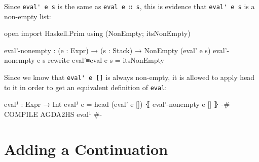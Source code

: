 \documentclass{article}
\begin{document}
\noindent
Since \verb!eval' e s! is the same as \verb!eval e ∷ s!, this is evidence that \verb!eval' e s! is a non-empty list:

\begin{code}
  open import Haskell.Prim using (NonEmpty; itsNonEmpty)

  eval'-nonempty : (e : Expr) → (s : Stack) → NonEmpty (eval' e s)
  eval'-nonempty e s rewrite eval'≡eval e s = itsNonEmpty
\end{code}

\noindent
Since we know that \verb!eval' e []! is always non-empty, it is allowed to apply head to it in order to get an equivalent definition of \texttt{eval}:

\begin{code}
  eval¹ : Expr → Int
  eval¹ e = head (eval' e []) ⦃ eval'-nonempty e [] ⦄
  {-# COMPILE AGDA2HS eval¹ #-}
\end{code}

\section{Adding a Continuation}
\end{document}
